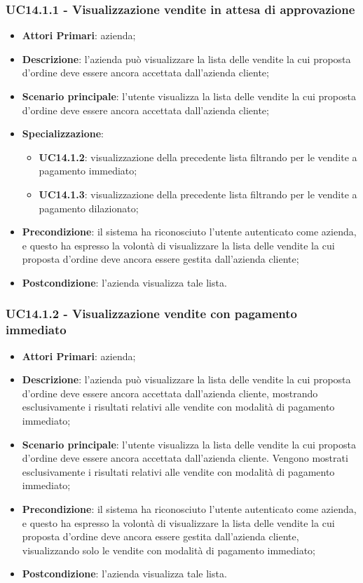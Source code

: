 \subsubsection{UC14.1.1 - Visualizzazione vendite in attesa di approvazione}
\begin{itemize}
	\item \textbf{Attori Primari}: azienda;
	\item \textbf{Descrizione}: l'azienda può visualizzare la lista delle vendite la cui proposta d'ordine deve essere ancora accettata dall'azienda cliente;
	\item \textbf{Scenario principale}: l'utente visualizza la lista delle vendite la cui proposta d'ordine deve essere ancora accettata dall'azienda cliente;
	\item \textbf{Specializzazione}:
	\begin{itemize}
		\item \textbf{UC14.1.2}: visualizzazione della precedente lista filtrando per le vendite a pagamento immediato;
		\item \textbf{UC14.1.3}: visualizzazione della precedente lista filtrando per le vendite a pagamento dilazionato\glo;
	\end{itemize}
	\item \textbf{Precondizione}: il sistema ha riconosciuto l'utente autenticato come azienda, e questo ha espresso la volontà di visualizzare la lista delle vendite la cui proposta d'ordine deve ancora essere gestita dall'azienda cliente;
	\item \textbf{Postcondizione}: l'azienda visualizza tale lista.
\end{itemize}


\subsubsection{UC14.1.2 - Visualizzazione vendite con pagamento immediato}
\begin{itemize}
	\item \textbf{Attori Primari}: azienda;
	\item \textbf{Descrizione}: l'azienda può visualizzare la lista delle vendite la cui proposta d'ordine deve essere ancora accettata dall'azienda cliente, mostrando esclusivamente i risultati relativi alle vendite con modalità di pagamento immediato;
	\item \textbf{Scenario principale}: l'utente visualizza la lista delle vendite la cui proposta d'ordine deve essere ancora accettata dall'azienda cliente. Vengono mostrati esclusivamente i risultati relativi alle vendite con modalità di pagamento immediato;
	\item \textbf{Precondizione}: il sistema ha riconosciuto l'utente autenticato come azienda, e questo ha espresso la volontà di visualizzare la lista delle vendite la cui proposta d'ordine deve ancora essere gestita dall'azienda cliente, visualizzando solo le vendite con modalità di pagamento immediato;
	\item \textbf{Postcondizione}: l'azienda visualizza tale lista.
\end{itemize}


